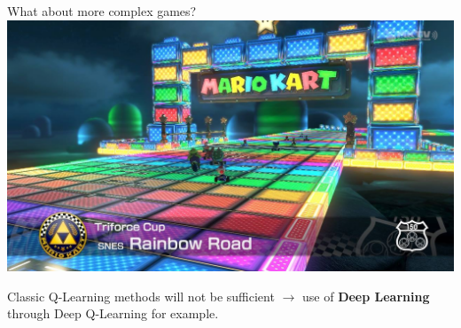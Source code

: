 \documentclass[aspectratio=169,xcolor=dvipsnames]{beamer}
\begin{document}
\begin{frame}{What about more complex games?}
\center
    \includegraphics[scale=0.25]{images/mk8snes.jpg}
    
    Classic Q-Learning methods will \colorbox{lightred}{not be sufficient} $\to$ use of \textbf{Deep Learning} through Deep Q-Learning for example.
\end{frame}

\end{document}
